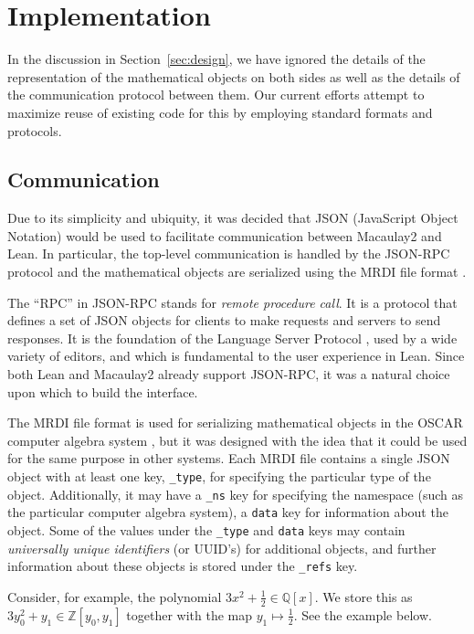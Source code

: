 \documentclass[runningheads]{llncs}
\newcommand{\QQ}{\mathbb Q}
\newcommand{\ZZ}{\mathbb Z}
\begin{document}
\section{Implementation}
\label{sec:implementation}

In the discussion in Section~\ref{sec:design}, we have ignored the details of the representation of the mathematical objects on both sides as well as the details of the communication protocol between them. Our current efforts attempt to maximize reuse of existing code for this by employing standard formats and protocols.

\subsection*{Communication}

Due to its simplicity and ubiquity, it was decided that JSON (JavaScript Object Notation) would be used to facilitate communication between Macaulay2 and Lean.  In particular, the top-level communication is handled by the JSON-RPC protocol \cite{jsonrpc} and the mathematical objects are serialized using the MRDI file format \cite{mrdi}.

The ``RPC'' in JSON-RPC stands for \textit{remote procedure call}.  It is a protocol that defines a set of JSON objects for clients to make requests and servers to send responses.  It is the foundation of the Language Server Protocol \cite{lsp}, used by a wide variety of editors, and which is fundamental to the user experience in Lean.  Since both Lean and Macaulay2 already support JSON-RPC, it was a natural choice upon which to build the interface.

The MRDI file format is used for serializing mathematical objects in the OSCAR computer algebra system \cite{OSCAR-Book,OSCAR}, but it was designed with the idea that it could be used for the same purpose in other systems.  Each MRDI file contains a single JSON object with at least one key, \texttt{\_type}, for specifying the particular type of the object.  Additionally, it may have a \texttt{\_ns} key for specifying the namespace (such as the particular computer algebra system), a \texttt{data} key for information about the object.  Some of the values under the \texttt{\_type} and \texttt{data} keys may contain \textit{universally unique identifiers} (or UUID's) for additional objects, and further information about these objects is stored under the \texttt{\_refs} key.

Consider, for example, the polynomial $3x^2 + \frac{1}{2}\in\QQ[x]$.  We store this as $3y_0^2 + y_1\in\ZZ[y_0,y_1]$ together with the map $y_1\mapsto\frac{1}{2}$.  See the example below.
\end{document}
